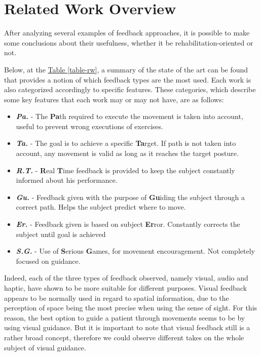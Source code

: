 \section{Related Work Overview}



After analyzing several examples of feedback approaches, it is possible to make some conclusions about their usefulness, whether it be rehabilitation-oriented or not.

Below, at the \hyperref[table-rw]{Table \ref{table-rw}}, a summary of the state of 
the art can be found that provides a notion of which feedback types are the most used. 
Each work is also categorized accordingly to specific features. These categories, which describe some key features that each work may or may not have, are as follows:
\begin{itemize}
\item \emph{\textbf{Pa.}} - The \textbf{Pa}th required to execute the movement is taken into account, useful to prevent wrong executions of exercises.
\item \emph{\textbf{Ta.}} - The goal is to achieve a specific \textbf{Ta}rget. If path is not taken into account, any movement is valid as long as it reaches the target posture.
\item \emph{\textbf{R.T.}} - \textbf{R}eal \textbf{T}ime feedback is provided to keep the subject constantly informed about his performance.
\item \emph{\textbf{Gu.}} - Feedback given with the purpose of \textbf{Gu}iding the subject through a correct path. Helps the subject predict where to move. 
\item \emph{\textbf{Er.}} - Feedback given is based on subject \textbf{Er}ror. Constantly corrects the subject until goal is achieved
\item \emph{\textbf{S.G.}} - Use of \textbf{S}erious \textbf{G}ames, for movement encouragement. Not completely focused on guidance.
\end{itemize}

Indeed, each of the three types of feedback observed, namely visual, audio and haptic, have shown to be more suitable for different purposes.
Visual feedback appears to be normally used in regard to spatial information, due to the perception of space being the most precise when using the sense of sight. For this reason,
the best option to guide a patient through movements seems to be by using visual guidance.
But it is important to note that visual feedback still is a rather broad concept, therefore we could observe different takes on the whole subject of visual guidance.

